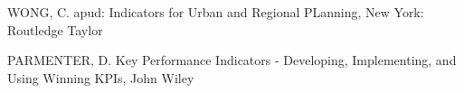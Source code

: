 \documentclass[
12pt,		%
openright,	%
twoside,  %
a4paper,			%
chapter=TITLE,		%
english,			%
french,				%
spanish,			%
brazil				%
]{USPSC-classe/USPSC}
\begin{document}
\begin{flushleft}
\begin{flushleft}
\begin{flushleft}
\begin{flushleft}
\begin{flushleft}
\begin{flushleft}
\begin{flushleft}
\begin{flushleft}
\begin{flushleft}
\begin{flushleft}
[WONG, 2006] WONG, C. apud: Indicators for Urban and Regional PLanning, New York: Routledge Taylor 
\end{flushleft}


\end{flushleft}


\end{flushleft}


\end{flushleft}


\end{flushleft}


\end{flushleft}


\end{flushleft}


\end{flushleft}


\end{flushleft}


\end{flushleft}


\begin{flushleft}
\begin{flushleft}
\begin{flushleft}
\begin{flushleft}
\begin{flushleft}
\begin{flushleft}
\begin{flushleft}
\begin{flushleft}
\begin{flushleft}
\begin{flushleft}
[PARMENTER, 2007] PARMENTER, D. Key Performance Indicators - Developing, Implementing, and Using Winning KPIs, John Wiley 
\end{flushleft}


\end{flushleft}


\end{flushleft}


\end{flushleft}


\end{flushleft}


\end{flushleft}


\end{flushleft}


\end{flushleft}


\end{flushleft}


\end{flushleft}
\end{document}

